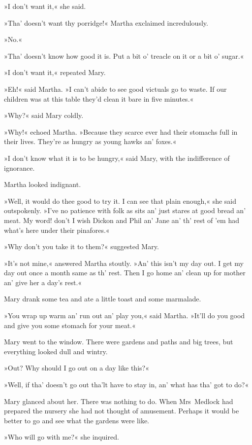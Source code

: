 »I don't want it,« she said.

»Tha' doesn't want thy porridge!« Martha exclaimed incredulously.

»No.«

»Tha' doesn't know how good it is. Put a bit o' treacle on it or a bit o' sugar.«

»I don't want it,« repeated Mary.

»Eh!« said Martha. »I can't abide to see good victuals go to waste. If our children was at this table they'd clean it bare in five minutes.«

»Why?« said Mary coldly.

»Why!« echoed Martha. »Because they scarce ever had their stomachs full in their lives. They're as hungry as young hawks an' foxes.«

»I don't know what it is to be hungry,« said Mary, with the indifference of ignorance.

Martha looked indignant.

»Well, it would do thee good to try it. I can see that plain enough,« she said outspokenly. »I've no patience with folk as sits an' just stares at good bread an' meat. My word! don't I wish Dickon and Phil an' Jane an' th' rest of 'em had what's here under their pinafores.«

»Why don't you take it to them?« suggested Mary.

»It's not mine,« answered Martha stoutly. »An' this isn't my day out. I get my day out once a month same as th' rest. Then I go home an' clean up for mother an' give her a day's rest.«

Mary drank some tea and ate a little toast and some marmalade.

»You wrap up warm an' run out an' play you,« said Martha. »It'll do you good and give you some stomach for your meat.«

Mary went to the window. There were gardens and paths and big trees, but everything looked dull and wintry.

»Out? Why should I go out on a day like this?«

»Well, if tha' doesn't go out tha'lt have to stay in, an' what has tha' got to do?«

Mary glanced about her. There was nothing to do. When Mrs~Medlock had prepared the nursery she had not thought of amusement. Perhaps it would be better to go and see what the gardens were like.

»Who will go with me?« she inquired.

